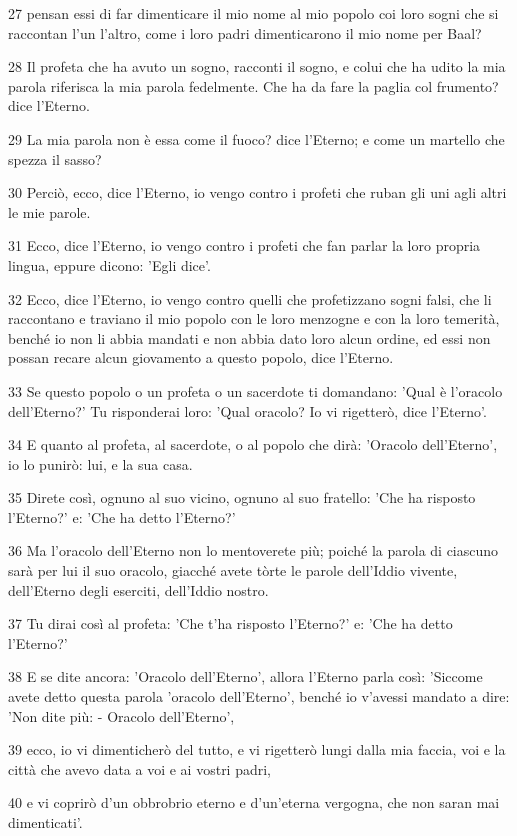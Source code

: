 \par 27 pensan essi di far dimenticare il mio nome al mio popolo coi loro sogni che si raccontan l'un l'altro, come i loro padri dimenticarono il mio nome per Baal?
\par 28 Il profeta che ha avuto un sogno, racconti il sogno, e colui che ha udito la mia parola riferisca la mia parola fedelmente. Che ha da fare la paglia col frumento? dice l'Eterno.
\par 29 La mia parola non è essa come il fuoco? dice l'Eterno; e come un martello che spezza il sasso?
\par 30 Perciò, ecco, dice l'Eterno, io vengo contro i profeti che ruban gli uni agli altri le mie parole.
\par 31 Ecco, dice l'Eterno, io vengo contro i profeti che fan parlar la loro propria lingua, eppure dicono: 'Egli dice'.
\par 32 Ecco, dice l'Eterno, io vengo contro quelli che profetizzano sogni falsi, che li raccontano e traviano il mio popolo con le loro menzogne e con la loro temerità, benché io non li abbia mandati e non abbia dato loro alcun ordine, ed essi non possan recare alcun giovamento a questo popolo, dice l'Eterno.
\par 33 Se questo popolo o un profeta o un sacerdote ti domandano: 'Qual è l'oracolo dell'Eterno?' Tu risponderai loro: 'Qual oracolo? Io vi rigetterò, dice l'Eterno'.
\par 34 E quanto al profeta, al sacerdote, o al popolo che dirà: 'Oracolo dell'Eterno', io lo punirò: lui, e la sua casa.
\par 35 Direte così, ognuno al suo vicino, ognuno al suo fratello: 'Che ha risposto l'Eterno?' e: 'Che ha detto l'Eterno?'
\par 36 Ma l'oracolo dell'Eterno non lo mentoverete più; poiché la parola di ciascuno sarà per lui il suo oracolo, giacché avete tòrte le parole dell'Iddio vivente, dell'Eterno degli eserciti, dell'Iddio nostro.
\par 37 Tu dirai così al profeta: 'Che t'ha risposto l'Eterno?' e: 'Che ha detto l'Eterno?'
\par 38 E se dite ancora: 'Oracolo dell'Eterno', allora l'Eterno parla così: 'Siccome avete detto questa parola 'oracolo dell'Eterno', benché io v'avessi mandato a dire: 'Non dite più: - Oracolo dell'Eterno',
\par 39 ecco, io vi dimenticherò del tutto, e vi rigetterò lungi dalla mia faccia, voi e la città che avevo data a voi e ai vostri padri,
\par 40 e vi coprirò d'un obbrobrio eterno e d'un'eterna vergogna, che non saran mai dimenticati'.

